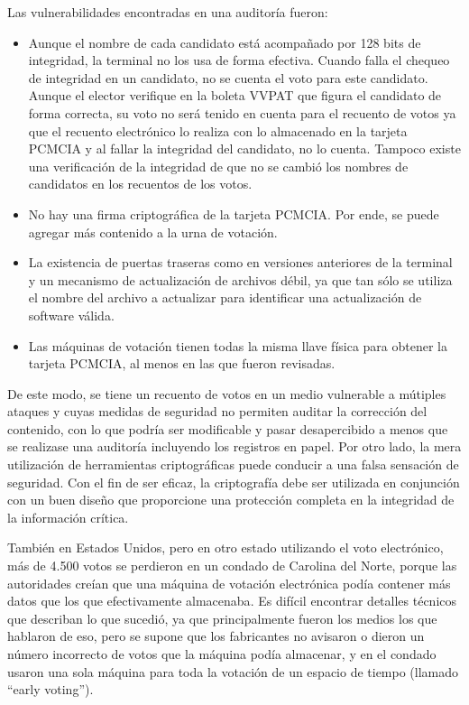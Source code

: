 Las vulnerabilidades encontradas en una auditoría fueron:
\begin{itemize}
	\item Aunque el nombre de cada candidato está acompañado por 128 bits de integridad, la terminal no los usa de forma efectiva. Cuando falla el chequeo de integridad en un candidato, no se cuenta el voto para este candidato. Aunque el elector verifique en la boleta VVPAT que figura el candidato de forma correcta, su voto no será tenido en cuenta para el recuento de votos ya que el recuento electrónico lo realiza con lo almacenado en la tarjeta PCMCIA y al fallar la integridad del candidato, no lo cuenta. Tampoco existe una verificación de la integridad de que no se cambió los nombres de candidatos en los recuentos de los votos.
	\item No hay una firma criptográfica de la tarjeta PCMCIA. Por ende, se puede agregar más contenido a la urna de votación.
	\item La existencia de puertas traseras como en versiones anteriores de la terminal y un mecanismo de actualización de archivos débil, ya que tan sólo se utiliza el nombre del archivo a actualizar para identificar una actualización de software válida.
	\item Las máquinas de votación tienen todas la misma llave física para obtener la tarjeta PCMCIA, al menos en las que fueron revisadas.
\end{itemize}

De este modo, se tiene un recuento de votos en un medio vulnerable a mútiples ataques y cuyas medidas de seguridad no permiten auditar la corrección del contenido, con lo que podría ser modificable y pasar desapercibido a menos que se realizase una auditoría incluyendo los registros en papel. Por otro lado, la mera utilización de herramientas criptográficas puede conducir a una falsa sensación de seguridad. Con el fin de ser eficaz, la criptografía debe ser utilizada en conjunción con un buen diseño que proporcione una protección completa en la integridad de la información crítica.

También en Estados Unidos, pero en otro estado utilizando el voto electrónico, más de 4.500 votos se perdieron en un condado de Carolina del Norte, porque las autoridades creían que una máquina de votación electrónica podía contener más datos que los que efectivamente almacenaba\cite{usatoday}. Es difícil encontrar detalles técnicos que describan lo que sucedió, ya que principalmente fueron los medios los que hablaron de eso, pero se supone que los fabricantes no avisaron o dieron un número incorrecto de votos que la máquina podía almacenar, y en el condado usaron una sola máquina para toda la votación de un espacio de tiempo (llamado ``early voting'').

